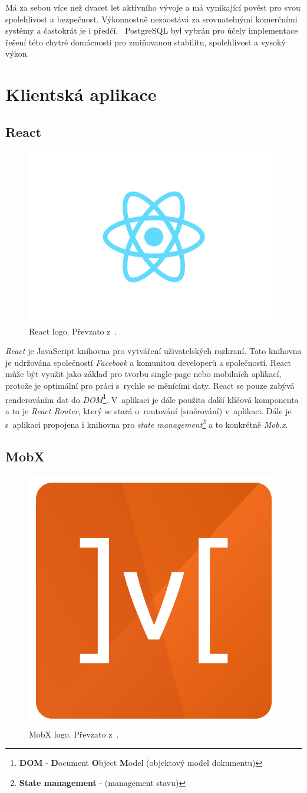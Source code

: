 Má za sebou více než dvacet let aktivního vývoje a má vynikající pověst pro svou spolehlivost a bezpečnost.
Výkonnostně nezaostává za srovnatelnými komerčními systémy a častokrát je i předčí.~\cite{postgres:wiki}
PostgreSQL byl vybrán pro účely implementace řešení této chytré domácnosti pro zmiňovanou stabilitu, spolehlivost a vysoký výkon.

\newpage
\section{Klientská aplikace}
\label{pouzite:frontend}

\subsection*{React}
\label{frontend:react}

\begin{figure}[hbt]
  \centering
  \includegraphics[width=.3 \linewidth]{obrazky-figures/react.png}
  \caption{React logo. Převzato z~\cite{react:info}.}
\end{figure}

\emph{React} je JavaScript knihovna pro vytváření uživatelských rozhraní.
Tato knihovna je udržována společností \emph{Facebook} a komunitou developerů a společností.
React může být využit jako základ pro tvorbu single-page nebo mobilních aplikací, protože je optimální pro práci s~rychle se měnícími daty.
React se pouze zabývá renderováním dat do \emph{DOM}\footnote{\textbf{DOM} - \textbf{D}ocument \textbf{O}bject \textbf{M}odel (objektový model dokumentu)}.
V~aplikaci je dále použita další klíčová komponenta a to je \emph{React Router}, který se stará o~routování (směrování) v~aplikaci.
Dále je s~aplikací propojena i knihovna pro \emph{state management}\footnote{\textbf{State management} - (management stavu)} a to konkrétně \emph{Mob.x}.~\cite{react:info}

\subsection*{MobX}
\label{frontend:mobx}
\begin{figure}[hbt]
  \centering
  \includegraphics[width=.1 \linewidth]{obrazky-figures/mobx.png}
  \caption{MobX logo. Převzato z~\cite{mobx:info}.}
\end{figure}

